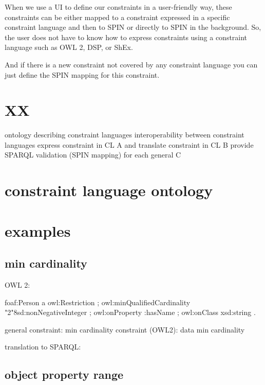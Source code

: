 \documentclass{llncs}
\begin{document}
When we use a UI to define our constraints in a user-friendly way, these constraints can be either mapped to a constraint expressed in a specific constraint language 
and then to SPIN or directly to SPIN in the background.    
So, the user does not have to know how to express constraints using a constraint language such as OWL 2, DSP, or ShEx.

And if there is a new constraint not covered by any constraint language you can just define the SPIN mapping for this constraint.

\section{XX}

ontology describing constraint languages
interoperability between constraint languages
express constraint in CL A and translate constraint in CL B
provide SPARQL validation (SPIN mapping) for each general C 

\section{constraint language ontology} 



\section{examples}

\subsection{min cardinality}

OWL 2:
\begin{ex}
foaf:Person
    a owl:Restriction ;
		owl:minQualifiedCardinality "2"^^xsd:nonNegativeInteger ;
		owl:onProperty :hasName ;
		owl:onClass xsd:string .
\end{ex}

general constraint: min cardinality
constraint (OWL2): data min cardinality


translation to SPARQL:
\begin{ex}

\end{ex}

\subsection{object property range}
\end{document}
